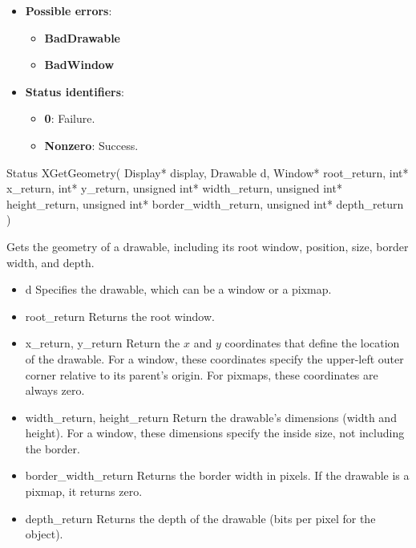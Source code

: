 \documentclass{report}
\begin{document}
\begin{itemize}
            \begin{itemize}
                \item \textbf{Possible errors}:
                    \begin{itemize}
                        \item \textbf{BadDrawable}
                        \item \textbf{BadWindow}
                    \end{itemize}
                \item \textbf{Status identifiers}:
                    \begin{itemize}
                        \item \textbf{0}: Failure.
                        \item \textbf{Nonzero}: Success.
                    \end{itemize}
            \end{itemize}

            \begin{cppcode}
                Status XGetGeometry(
                    Display* display, 
                    Drawable d,
                    Window* root_return,
                    int* x_return, int* y_return,
                    unsigned int* width_return, unsigned int* height_return,
                    unsigned int* border_width_return,
                    unsigned int* depth_return
                )
            \end{cppcode}
            \bigbreak \noindent
            Gets the geometry of a drawable, including its root window, position, size, border width, and depth.

            \begin{itemize}
                \item d Specifies the drawable, which can be a window or a pixmap.
                \item root\_return Returns the root window.
                \item x\_return, y\_return Return the $x$ and $y$ coordinates that define the location of the drawable. For a window, these coordinates specify the upper-left outer corner relative to its parent’s origin. For pixmaps, these coordinates are always zero.
                \item width\_return, height\_return Return the drawable’s dimensions (width and height). For a window, these dimensions specify the inside size, not including the border.
                \item border\_width\_return Returns the border width in pixels. If the drawable is a pixmap, it returns zero.
                \item depth\_return Returns the depth of the drawable (bits per pixel for the object).
            \end{itemize}


\end{itemize}
\end{document}
